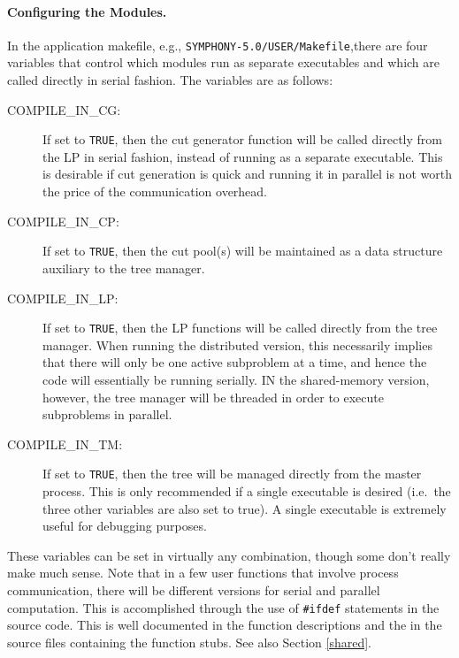 \paragraph{Configuring the Modules.}
\label{configuration}
In the application makefile, e.g., \texttt{SYMPHONY-5.0/USER/Makefile},there
are four variables that control which modules run as separate executables and
which are called directly in serial fashion. The variables are as follows:
\begin{description}
        \item [COMPILE\_IN\_CG:] If set to {\tt TRUE}, then the cut generator
        function will be called directly from the LP in serial
        fashion, instead of running as a separate executable. This is
        desirable if cut generation is quick and running it in
        parallel is not worth the price of the communication overhead.
        \item [COMPILE\_IN\_CP:] If set to {\tt TRUE}, then the cut
        pool(s) will be maintained as a data structure auxiliary to the
        tree manager. 
        \item [COMPILE\_IN\_LP:] If set to {\tt TRUE}, then the LP
        functions will be called directly from the tree manager. When
        running the distributed version, this
        necessarily implies that there will only be one active
        subproblem at a time, and hence the code will essentially be
        running serially. IN the shared-memory version, however, the
        tree manager will be threaded in order to execute subproblems 
        in parallel.
        \item [COMPILE\_IN\_TM:] If set to {\tt TRUE}, then the tree
        will be managed directly from the master process. This is only
        recommended if a single executable is desired (i.e.~the three
        other variables are also set to true). A single executable is
        extremely useful for debugging purposes.
\end{description}
These variables can be set in virtually any combination, though some
don't really make much sense. Note that in a few user functions that
involve process communication, there will be different versions for
serial and parallel computation. This is accomplished through the use
of {\tt \#ifdef} statements in the source code. This is well documented
in the function descriptions and the in the source files containing
the function stubs. See also Section \ref{shared}.

